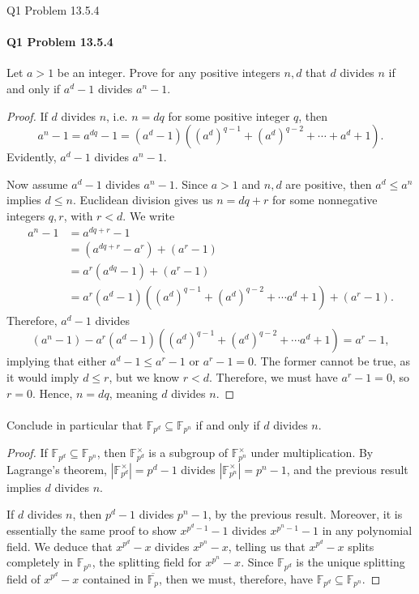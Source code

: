 \documentclass[12pt]{article}
\newenvironment{fullbox}{\begin{lrbox}{\savefullbox}\begin{minipage}{\dimexpr\textwidth-2\fboxsep\relax}}{\end{minipage}\end{lrbox}\begin{center}\framebox[\textwidth]{\usebox{\savefullbox}}\end{center}}
\newenvironment{pbox}[1][]{\begin{fullbox}\ifx#1\empty\else\paragraph{#1}\fi}{\end{fullbox}}
\theoremstyle{definition}
\newcommand{\clo}{\overline}
\newcommand{\F}{\mathbb{F}}
\begin{document}
\thispagestyle{title}


\begin{pbox}[Q1 Problem 13.5.4]
    Let $a > 1$ be an integer. Prove for any positive integers $n, d$ that $d$ divides $n$ if and only if $a^d - 1$ divides $a^n - 1$. 
\end{pbox}

\begin{proof}
    If $d$ divides $n$, i.e. $n = dq$ for some positive integer $q$, then
    \[
        a^n - 1 = a^{dq} - 1 = (a^d - 1)\left((a^d)^{q - 1} + (a^d)^{q - 2} + \cdots + a^{d} + 1\right).
    \]
    Evidently, $a^d - 1$ divides $a^n - 1$.

    Now assume $a^d - 1$ divides $a^n - 1$. Since $a > 1$ and $n, d$ are positive, then $a^d \leq a^n$ implies $d \leq n$. Euclidean division gives us $n = dq + r$ for some nonnegative integers $q, r$, with $r < d$. We write
    \begin{align*}
        a^n - 1
            &= a^{dq + r} - 1 \\
            &= (a^{dq + r} - a^r) + (a^r - 1) \\
            &= a^r(a^{dq} - 1) + (a^r - 1) \\
            &= a^r(a^d - 1)\left((a^d)^{q - 1} + (a^d)^{q - 2} + \cdots a^{d} + 1\right) + (a^r - 1).
    \end{align*}
    Therefore, $a^d - 1$ divides
    \[
        (a^n - 1) - a^r(a^d - 1)\left((a^d)^{q - 1} + (a^d)^{q - 2} + \cdots a^{d} + 1\right) = a^r - 1,
    \]
    implying that either $a^d - 1 \leq a^r - 1$ or $a^r - 1 = 0$. The former cannot be true, as it would imply $d \leq r$, but we know $r < d$. Therefore, we must have $a^r - 1 = 0$, so $r = 0$. Hence, $n = dq$, meaning $d$ divides $n$.

\end{proof}

\begin{pbox}[]
    Conclude in particular that $\F_{p^d} \subseteq \F_{p^n}$ if and only if $d$ divides $n$.
\end{pbox}

\begin{proof}
    If $\F_{p^d} \subseteq \F_{p^n}$, then $\F_{p^d}^\times$ is a subgroup of $\F_{p^n}^\times$ under multiplication. By Lagrange's theorem, $|\F_{p^d}^\times| = p^d - 1$ divides $|\F_{p^n}^\times| = p^n - 1$, and the previous result implies $d$ divides $n$.

    If $d$ divides $n$, then $p^d - 1$ divides $p^n - 1$, by the previous result. Moreover, it is essentially the same proof to show $x^{p^d - 1} - 1$ divides $x^{p^n - 1} - 1$ in any polynomial field. We deduce that $x^{p^d} - x$ divides $x^{p^n} - x$, telling us that $x^{p^d} - x$ splits completely in $\F_{p^n}$, the splitting field for $x^{p^n} - x$. Since $\F_{p^d}$ is the unique splitting field of $x^{p^d} - x$ contained in $\clo{\F_p}$, then we must, therefore, have $\F_{p^d} \subseteq \F_{p^n}$.

\end{proof}
\end{document}
